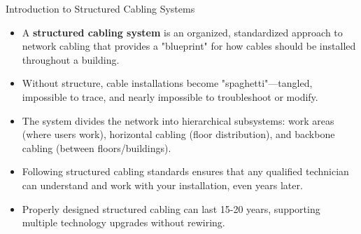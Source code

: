 \documentclass[aspectratio=169]{beamer}
\begin{document}
\begin{frame}{Introduction to Structured Cabling Systems}
    \begin{itemize}
        \item A \textbf{structured cabling system} is an organized, standardized approach to network cabling that provides a "blueprint" for how cables should be installed throughout a building.
        \item Without structure, cable installations become "spaghetti"---tangled, impossible to trace, and nearly impossible to troubleshoot or modify.
        \item The system divides the network into hierarchical subsystems: work areas (where users work), horizontal cabling (floor distribution), and backbone cabling (between floors/buildings).
        \item Following structured cabling standards ensures that any qualified technician can understand and work with your installation, even years later.
        \item Properly designed structured cabling can last 15-20 years, supporting multiple technology upgrades without rewiring.
    \end{itemize}
\end{frame}
\end{document}
